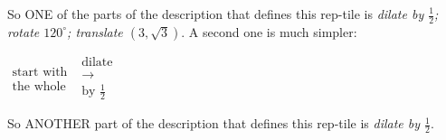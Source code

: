 So ONE of the parts of the description that defines this rep-tile is
\textit{dilate by $\frac12$; rotate $120^\circ$; translate $(3,\sqrt3)$}. A second one is much simpler:
\begin{center}
$\begin{array}{c} \text{start with}\\ \text{the whole} \end{array}$ 
$\begin{array}{c} \text{dilate }\\ \longrightarrow\\ \text{by }\frac12 \end{array}$ \\
\par\end{center}
So ANOTHER part of the description that defines this rep-tile is \textit{dilate by $\frac12$}.

